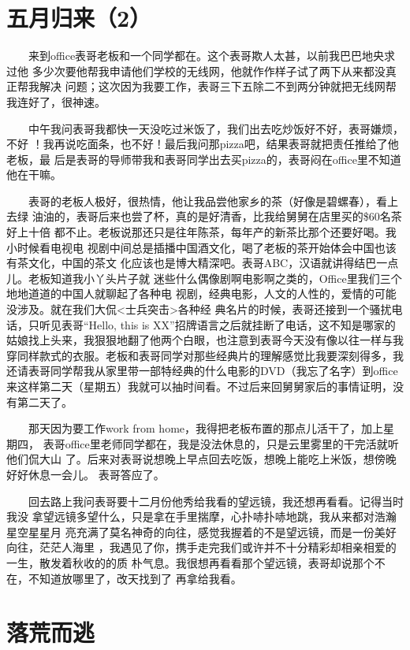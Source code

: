 \documentclass[12pt]{book}
\begin{document}
\section{五月归来（2）}
\label{sec-8-16}

　　来到office表哥老板和一个同学都在。这个表哥欺人太甚，以前我巴巴地央求过他
多少次要他帮我申请他们学校的无线网，他就作作样子试了两下从来都没真正帮我解决
问题；这次因为我要工作，表哥三下五除二不到两分钟就把无线网帮我连好了，很神速。

　　中午我问表哥我都快一天没吃过米饭了，我们出去吃炒饭好不好，表哥嫌烦，不好
！我再说吃面条，也不好！最后我问那pizza吧，结果表哥就把责任推给了他老板，最
后是表哥的导师带我和表哥同学出去买pizza的，表哥闷在office里不知道他在干嘛。

　　表哥的老板人极好，很热情，他让我品尝他家乡的茶（好像是碧螺春），看上去绿
油油的，表哥后来也尝了杯，真的是好清香，比我给舅舅在店里买的\$60名茶好上十倍
都不止。老板说那还只是往年陈茶，每年产的新茶比那个还要好喝。我小时候看电视电
视剧中间总是插播中国酒文化，喝了老板的茶开始体会中国也该有茶文化，中国的茶文
化应该也是博大精深吧。表哥ABC，汉语就讲得结巴一点儿。老板知道我小丫头片子就
迷些什么偶像剧啊电影啊之类的，Office里我们三个地地道道的中国人就聊起了各种电
视剧，经典电影，人文的人性的，爱情的可能没涉及。就在我们大侃<士兵突击>各种经
典名片的时候，表哥还接到一个骚扰电话，只听见表哥“Hello, this is XX”招牌语言之后就挂断了电话，这不知是哪家的姑娘找上头来，我狠狠地翻了他两个白眼，也注意到表哥今天没有像以往一样与我穿同样款式的衣服。老板和表哥同学对那些经典片的理解感觉比我要深刻得多，我还请表哥同学帮我从家里带一部特经典的什么电影的DVD（我忘了名字）到office来这样第二天（星期五）我就可以抽时间看。不过后来回舅舅家后的事情证明，没有第二天了。

　　那天因为要工作work from home，我得把老板布置的那点儿活干了，加上星期四，
表哥office里老师同学都在，我是没法休息的，只是云里雾里的干完活就听他们侃大山
了。后来对表哥说想晚上早点回去吃饭，想晚上能吃上米饭，想傍晚好好休息一会儿。
表哥答应了。

　　回去路上我问表哥要十二月份他秀给我看的望远镜，我还想再看看。记得当时我没
拿望远镜多望什么，只是拿在手里揣摩，心扑哧扑哧地跳，我从来都对浩瀚星空星星月
亮充满了莫名神奇的向往，感觉我握着的不是望远镜，而是一份美好向往，茫茫人海里
，我遇见了你，携手走完我们或许并不十分精彩却相亲相爱的一生，散发着秋收的的质
朴气息。我很想再看看那个望远镜，表哥却说那个不在，不知道放哪里了，改天找到了
再拿给我看。
\section{落荒而逃}
\label{sec-8-17}
\end{document}
